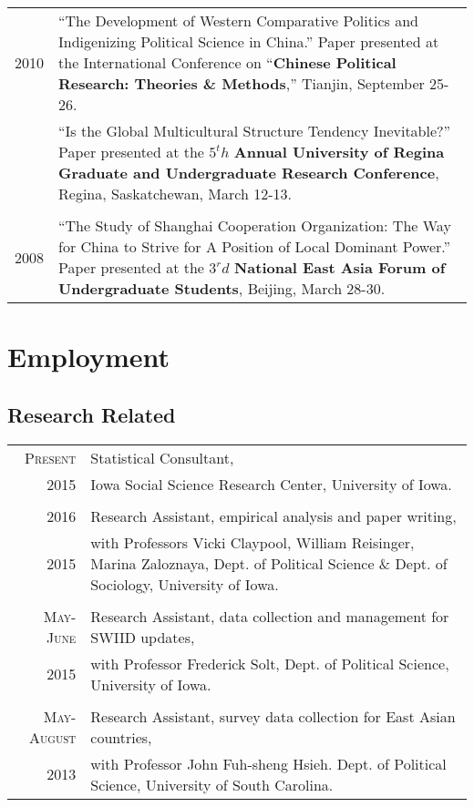 \documentclass[a4paper,10pt]{article} %
\begin{document}
\begin{longtable}{r|p{}}
		2010& ``The Development of Western Comparative Politics and Indigenizing Political Science in China.'' Paper presented at the International Conference on ``\textbf{Chinese Political Research: Theories \& Methods},'' Tianjin, September 25-26.\\
			& ``Is the Global Multicultural Structure Tendency Inevitable?'' Paper presented at the $5^th$ \textbf{Annual University of Regina Graduate and Undergraduate Research Conference}, Regina, Saskatchewan, March 12-13.\\
		\multicolumn{2}{c}{} \\
		
		2008& ``The Study of Shanghai Cooperation Organization: The Way for China to Strive for A Position of Local Dominant Power.'' Paper presented at the $3^rd$ \textbf{National East Asia Forum of Undergraduate Students}, Beijing, March 28-30.
	\end{longtable}



\section{Employment}
	\subsection*{Research Related}
		\begin{tabular}{r|p{}}
			\textsc{Present}&  Statistical Consultant,\\
			2015& \small Iowa Social Science Research Center, University of Iowa. \\
			\multicolumn{2}{c}{} \\
			
			\textsc{2016}& Research Assistant, empirical analysis and paper writing,\\
			2015& \small with Professors Vicki Claypool, William Reisinger, Marina Zaloznaya, Dept. of Political Science \& Dept. of Sociology, University of Iowa. \\
			\multicolumn{2}{c}{} \\
			
			\textsc{May-June}& Research Assistant, data collection and management for SWIID updates,\\
			2015& \small with Professor Frederick Solt, Dept. of Political Science, University of Iowa. \\
			\multicolumn{2}{c}{} \\
			
			\textsc{May-August}& Research Assistant, survey data collection for East Asian countries,\\
			2013& \small with Professor John Fuh-sheng Hsieh. Dept. of Political Science, University of South Carolina.
		\end{tabular}
	
\end{document}
